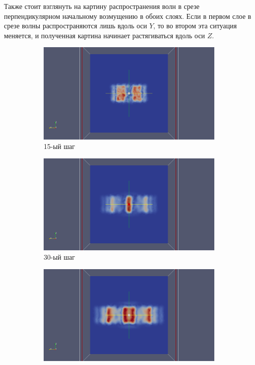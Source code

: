 	Также стоит взглянуть на картину распространения волн в срезе перпендикулярном начальному возмущению в обоих слоях.
	Если в первом слое в срезе волны распространяются лишь вдоль оси $Y$, то во втором эта ситуация меняется, и полученная картина начинает растягиваться вдоль оси $Z$.
	
\begin{figure}[H]
\begin{subfigure}[b]{0.5\textwidth}
\centering
\includegraphics[width=1.0\textwidth]{png/two-graphite-layers/slice_15.png}
\caption{15-ый шаг}
\end{subfigure}
\begin{subfigure}[b]{0.5\textwidth}
\centering
\includegraphics[width=1.0\textwidth]{png/two-graphite-layers/slice_30.png}
\caption{30-ый шаг}
\end{subfigure}
\begin{subfigure}[b]{0.5\textwidth}
\centering
\includegraphics[width=1.0\textwidth]{png/two-graphite-layers/slice_40.png}

\end{subfigure}
\end{figure}

